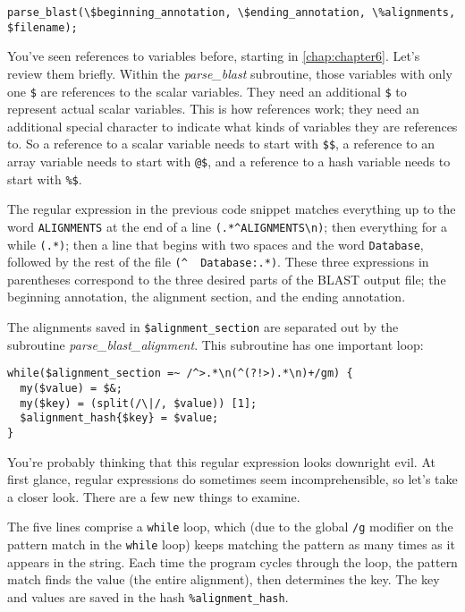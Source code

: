 \begin{lstlisting}
parse_blast(\$beginning_annotation, \$ending_annotation, \%alignments, $filename);
\end{lstlisting}

You've seen references to variables before, starting in \autoref{chap:chapter6}. Let's review them briefly. Within the \textit{parse\_blast} subroutine, those variables with only one \verb|$| are references to the scalar variables. They need an additional \verb|$| to represent actual scalar variables. This is how references work; they need an additional special character to indicate what kinds of variables they are references to. So a reference to a scalar variable needs to start with \verb|$$|, a reference to an array variable needs to start with \verb|@$|, and a reference to a hash variable needs to start with \verb|%$|. 

The regular expression in the previous code snippet matches everything up to the word \verb|ALIGNMENTS| at the end of a line \verb|(.*^ALIGNMENTS\n)|; then everything for a while \verb|(.*)|; then a line that begins with two spaces and the word \verb|Database|, followed by the rest of the file \verb|(^  Database:.*)|. These three expressions in parentheses correspond to the three desired parts of the BLAST output file; the beginning annotation, the alignment section, and the ending annotation.

The alignments saved in \verb|$alignment_section| are separated out by the subroutine \textit{parse\_blast\_alignment}. This subroutine has one important loop:

\begin{lstlisting}
while($alignment_section =~ /^>.*\n(^(?!>).*\n)+/gm) {
  my($value) = $&;
  my($key) = (split(/\|/, $value)) [1];
  $alignment_hash{$key} = $value;
}
\end{lstlisting}

You're probably thinking that this regular expression looks downright evil. At first glance, regular expressions do sometimes seem incomprehensible, so let's take a closer look. There are a few new things to examine.

The five lines comprise a \verb|while| loop, which (due to the global \verb|/g| modifier on the pattern match in the \verb|while| loop) keeps matching the pattern as many times as it appears in the string. Each time the program cycles through the loop, the pattern match finds the value (the entire alignment), then determines the key. The key and values are saved in the hash \verb|%alignment_hash|.

